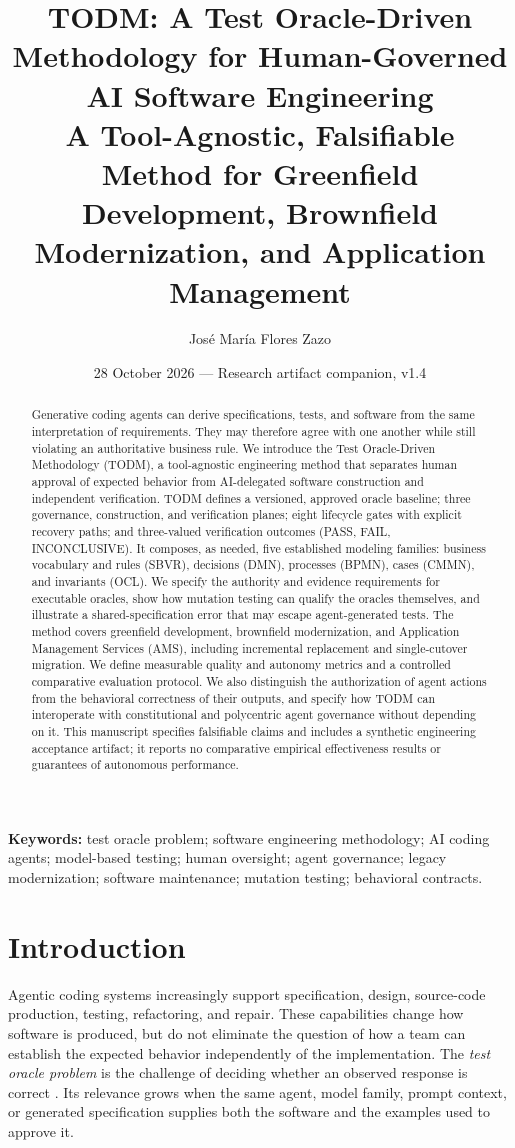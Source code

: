 \documentclass[11pt,a4paper]{article}
\title{\textbf{TODM: A Test Oracle-Driven Methodology for Human-Governed AI Software Engineering}\\[5pt]\large A Tool-Agnostic, Falsifiable Method for Greenfield Development, Brownfield Modernization, and Application Management}
\author{Jos\'e Mar\'ia Flores Zazo}
\date{28 October 2026 --- Research artifact companion, v1.4}
\begin{document}
\maketitle
\vspace{-1.3em}
\begin{abstract}
Generative coding agents can derive specifications, tests, and software from the same interpretation of requirements. They may therefore agree with one another while still violating an authoritative business rule. We introduce the Test Oracle-Driven Methodology (TODM), a tool-agnostic engineering method that separates human approval of expected behavior from AI-delegated software construction and independent verification. TODM defines a versioned, approved oracle baseline; three governance, construction, and verification planes; eight lifecycle gates with explicit recovery paths; and three-valued verification outcomes (PASS, FAIL, INCONCLUSIVE). It composes, as needed, five established modeling families: business vocabulary and rules (SBVR), decisions (DMN), processes (BPMN), cases (CMMN), and invariants (OCL). We specify the authority and evidence requirements for executable oracles, show how mutation testing can qualify the oracles themselves, and illustrate a shared-specification error that may escape agent-generated tests. The method covers greenfield development, brownfield modernization, and Application Management Services (AMS), including incremental replacement and single-cutover migration. We define measurable quality and autonomy metrics and a controlled comparative evaluation protocol. We also distinguish the authorization of agent actions from the behavioral correctness of their outputs, and specify how TODM can interoperate with constitutional and polycentric agent governance without depending on it. This manuscript specifies falsifiable claims and includes a synthetic engineering acceptance artifact; it reports no comparative empirical effectiveness results or guarantees of autonomous performance.
\end{abstract}
\noindent\textbf{Keywords:} test oracle problem; software engineering methodology; AI coding agents; model-based testing; human oversight; agent governance; legacy modernization; software maintenance; mutation testing; behavioral contracts.

\section{Introduction}
Agentic coding systems increasingly support specification, design, source-code production, testing, refactoring, and repair. These capabilities change how software is produced, but do not eliminate the question of how a team can establish the expected behavior independently of the implementation. The \emph{test oracle problem} is the challenge of deciding whether an observed response is correct \cite{barr2015oracle}. Its relevance grows when the same agent, model family, prompt context, or generated specification supplies both the software and the examples used to approve it.
\end{document}
